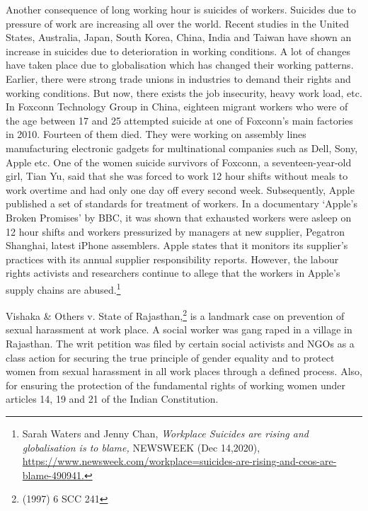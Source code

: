 \begin{multicols}{2}
\vspace{-.1cm}

\noi
Another consequence of long working hour is suicides of workers. Suicides due to pressure
of work are increasing all over the world. Recent studies in the United States, Australia,
Japan, South Korea, China, India and Taiwan have shown an increase in suicides due to
deterioration in working conditions. A lot of changes have taken place due to globalisation
which has changed their working patterns. Earlier, there were strong trade unions in
industries to demand their rights and working conditions. But now, there exists the job
insecurity, heavy work load, etc. In Foxconn Technology Group in China, eighteen migrant 
workers who were of the age between 17 and 25 attempted suicide at one of Foxconn’s main
factories in 2010. Fourteen of them died. They were working on assembly lines
manufacturing electronic gadgets for multinational companies such as Dell, Sony, Apple etc.
One of the women suicide survivors of Foxconn, a seventeen-year-old girl, Tian Yu, said that
she was forced to work 12 hour shifts without meals to work overtime and had only one day
off every second week. Subsequently, Apple published a set of standards for treatment of
workers. In a documentary ‘Apple’s Broken Promises’ by BBC, it was shown that exhausted
workers were asleep on 12 hour shifts and workers pressurized by managers at new supplier,
Pegatron Shanghai, latest iPhone assemblers. Apple states that it monitors its supplier’s
practices with its annual supplier responsibility reports. However, the labour rights activists
and researchers continue to allege that the workers in Apple’s supply chains are abused.\footnote{Sarah Waters and Jenny Chan, \textit{Workplace Suicides are rising and globalisation is to blame,} NEWSWEEK
(Dec 14,2020),\\ \url{https://www.newsweek.com/workplace=suicides-are-rising-and-ceos-are-blame-490941.}}




\noi
Vishaka \& Others v. State of Rajasthan,\footnote{(1997) 6 SCC 241} is a landmark case on prevention of sexual
harassment at work place. A social worker was gang raped in a village in Rajasthan. The writ
petition was filed by certain social activists and NGOs as a class action for securing the true
principle of gender equality and to protect women from sexual harassment in all work places
through a defined process. Also, for ensuring the protection of the fundamental rights of
working women under articles 14, 19 and 21 of the Indian Constitution.


\end{multicols}
